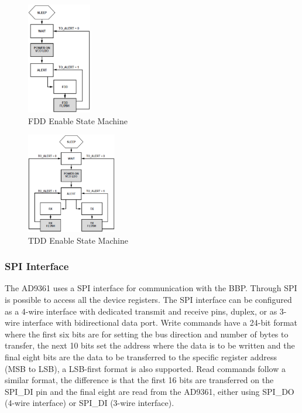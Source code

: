 \begin{figure}[htbp]
    \centering
    \includegraphics[width=0.25\textwidth]{./figures/fdd_ensm}
    \caption{ FDD Enable State Machine
    \label{fig:fddensm}}
\end{figure}

\begin{figure}[htbp]
    \centering
    \includegraphics[width=0.35\textwidth]{./figures/tdd_ensm}
    \caption{ TDD Enable State Machine
    \label{fig:tddensm}}
\end{figure}


\subsubsection{SPI Interface}

The AD9361 uses a SPI interface for communication with the BBP. Through SPI is
possible to access all the device registers. The SPI interface can be configured
as a 4-wire interface with dedicated transmit and receive pins, duplex, or as
3-wire interface with bidirectional data port. Write commands have a 24-bit
format where the first six bits are for setting the bus direction and number of
bytes to transfer, the next 10 bits set the address where the data is to be
written and the final eight bits are the data to be transferred to the specific
register address (MSB to LSB), a LSB-first format is also supported. Read
commands follow a similar format, the difference is that the first 16 bits are
transferred on the SPI\_DI pin and the final eight are read from the AD9361,
either using SPI\_DO (4-wire interface) or SPI\_DI (3-wire interface).

